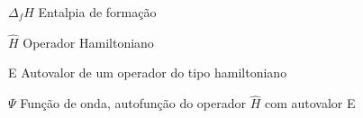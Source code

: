 \documentclass[
	12pt,				%
	openright,			%
	twoside,			%
	a4paper,			%
	english,			%
	french,				%
	spanish,			%
	brazil				%
	]{abntex2}
\begin{document}
\begin{simbolos}
	
	\item[$ \Delta_fH$ ] Entalpia de formação
	\item[$ \hat{H} $] Operador Hamiltoniano
	\item[E] Autovalor de um operador do tipo hamiltoniano
	\item[$ \Psi $] Função de onda, autofunção do operador $\hat{H}$ com autovalor E
	
\end{simbolos}
\tableofcontents*
\cleardoublepage



\textual

\pagestyle{fancy} %
\fancyhead[EL,OR]{\thepage} %
\renewcommand{\headrulewidth}{0pt} %








%

\postextual




\end{document}
